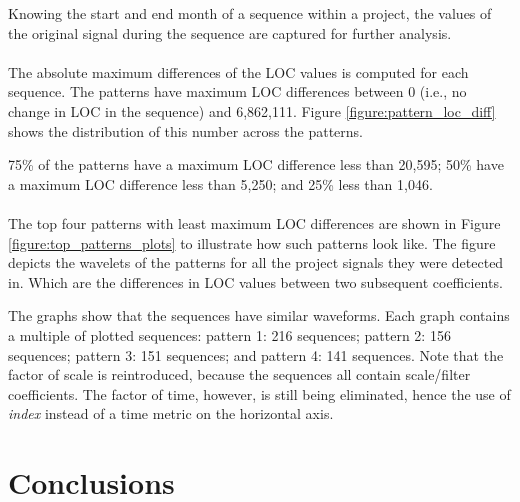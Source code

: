Knowing the start and end month of a sequence within a project, the values of
the original signal during the sequence are captured for further analysis.

\paragraph{}
The absolute maximum differences of the LOC values is computed for each
sequence. The patterns have maximum LOC differences between 0 (i.e., no change
in LOC in the sequence) and 6,862,111. Figure \ref{figure:pattern_loc_diff}
shows the distribution of this number across the patterns.



75\% of the patterns have a maximum LOC difference less than 20,595; 50\% have
a maximum LOC difference less than 5,250; and 25\% less than 1,046.

\paragraph{}
The top four patterns with least maximum LOC differences are shown in Figure
\ref{figure:top_patterns_plots} to illustrate how such patterns look like. The
figure depicts the wavelets of the patterns for all the project signals they
were detected in. Which are the differences in LOC values between two subsequent
coefficients.

The graphs show that the sequences have similar waveforms. Each graph contains
a multiple of plotted sequences: pattern 1: 216 sequences; pattern 2: 156
sequences; pattern 3: 151 sequences; and pattern 4: 141 sequences. Note that
the factor of scale is reintroduced, because the sequences all contain
scale/filter coefficients. The factor of time, however, is still being
eliminated, hence the use of \emph{index }\rm instead of a time metric on the
horizontal axis.



\section{Conclusions}

